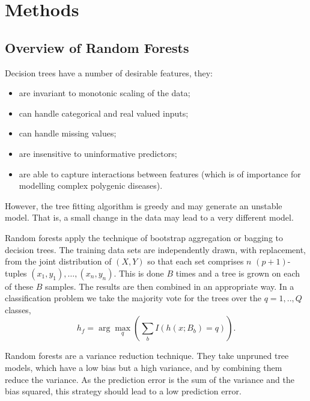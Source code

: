 \documentclass[10pt,letterpaper]{article}
\begin{document}
\section{Methods}
\label{section:methods}

\subsection{Overview of Random Forests}

Decision trees have a number of desirable features, they:
\begin{itemize}
  \item are invariant to monotonic scaling of the data;
  \item can handle categorical and real valued inputs;
  \item can handle missing values;
  \item are insensitive to uninformative predictors;
  \item are able to capture interactions between features (which is of importance for modelling complex polygenic diseases).
  \end{itemize}
However, the tree fitting algorithm is greedy and may generate an unstable model. That is, a small change in the data may
lead to a very different model. 

Random forests  apply the technique of bootstrap aggregation or bagging to decision trees.  The training
data sets are independently drawn, with replacement,  from the joint distribution of $(X,Y)$ so that each set comprises $n$ $(p+1)$-tuples
 $(x_1,y_1),\ldots, (x_n,y_n)$. This is done $B$ times and  a tree is grown on each of these $B$ samples.
The results are then combined in an appropriate way. In a classification problem we take the majority vote for the trees over
the $q=1,..,Q$ classes,
\begin{equation*}
{{h_f}}= \arg \max_q \left(\sum_b I(h(x;B_b)=q)\right).
\end{equation*}

Random forests are a variance reduction technique. They take unpruned tree models, which have a low bias but a high
variance, and by combining them reduce the variance. As the prediction error is the sum of the variance and the bias
squared, this strategy should lead to a low prediction error.
\end{document}
